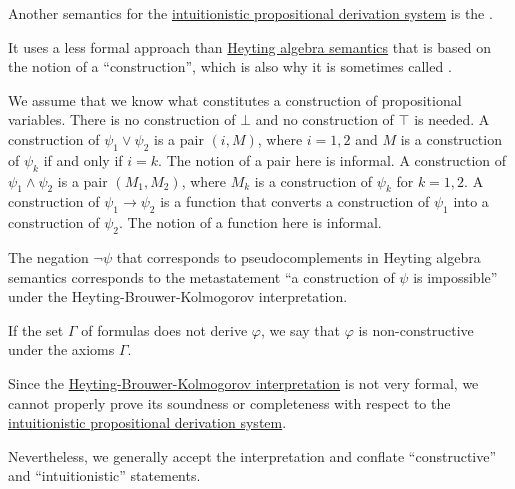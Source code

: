 \begin{definition}\label{def:brouwer_heyting_kolmogorov_interpretation}
  Another semantics for the \hyperref[def:intuitionistic_propositional_derivation_system]{intuitionistic propositional derivation system} is the .

  It uses a less formal approach than \hyperref[def:propositional_heyting_algebra_semantics]{Heyting algebra semantics} that is based on the notion of a \enquote{construction}, which is also why it is sometimes called .

  \begin{thmenum}
     We assume that we know what constitutes a construction of propositional variables.
     There is no construction of \( \bot \) and no construction of \( \top \) is needed.
     A construction of \( \psi_1 \vee \psi_2 \) is a pair \( (i, M) \), where \( i = 1, 2 \) and \( M \) is a construction of \( \psi_k \) if and only if \( i = k \). The notion of a pair here is informal.
     A construction of \( \psi_1 \wedge \psi_2 \) is a pair \( (M_1, M_2) \), where \( M_k \) is a construction of \( \psi_k \) for \( k = 1, 2 \).
     A construction of \( \psi_1 \rightarrow \psi_2 \) is a function that converts a construction of \( \psi_1 \) into a construction of \( \psi_2 \). The notion of a function here is informal.
  \end{thmenum}

  The negation \( \neg\psi \) that corresponds to pseudocomplements in Heyting algebra semantics corresponds to the metastatement \enquote{a construction of \( \psi \) is impossible} under the Heyting-Brouwer-Kolmogorov interpretation.

  If the set \( \Gamma \) of formulas does not derive \( \varphi \), we say that \( \varphi \) is non-constructive under the axioms \( \Gamma \).
\end{definition}

\begin{remark}\label{rem:brouwer_heyting_kolmogorov_interpretation_compatibility}
  Since the \hyperref[def:brouwer_heyting_kolmogorov_interpretation]{Heyting-Brouwer-Kolmogorov interpretation} is not very formal, we cannot properly prove its soundness or completeness with respect to the \hyperref[def:intuitionistic_propositional_derivation_system]{intuitionistic propositional derivation system}.

  Nevertheless, we generally accept the interpretation and conflate \enquote{constructive} and \enquote{intuitionistic} statements.
\end{remark}

